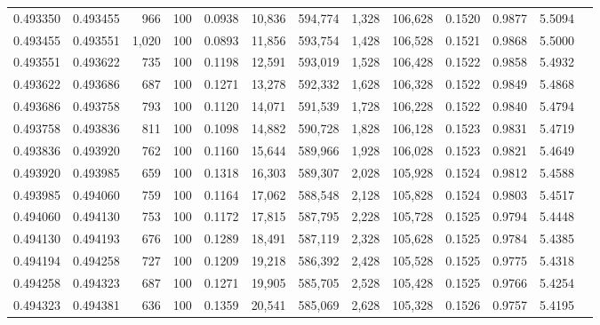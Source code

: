 \begin{tabular}{rrrrrrrrrrrrr}
0.493350 & 0.493455 &   966 & 100 &                                     0.0938 &  10,836 & 594,774 &   1,328 & 106,628 & 0.1520 & 0.9877 & 5.5094 \\
0.493455 & 0.493551 & 1,020 & 100 &                                     0.0893 &  11,856 & 593,754 &   1,428 & 106,528 & 0.1521 & 0.9868 & 5.5000 \\
0.493551 & 0.493622 &   735 & 100 &                                     0.1198 &  12,591 & 593,019 &   1,528 & 106,428 & 0.1522 & 0.9858 & 5.4932 \\
0.493622 & 0.493686 &   687 & 100 &                                     0.1271 &  13,278 & 592,332 &   1,628 & 106,328 & 0.1522 & 0.9849 & 5.4868 \\
0.493686 & 0.493758 &   793 & 100 &                                     0.1120 &  14,071 & 591,539 &   1,728 & 106,228 & 0.1522 & 0.9840 & 5.4794 \\
0.493758 & 0.493836 &   811 & 100 &                                     0.1098 &  14,882 & 590,728 &   1,828 & 106,128 & 0.1523 & 0.9831 & 5.4719 \\
0.493836 & 0.493920 &   762 & 100 &                                     0.1160 &  15,644 & 589,966 &   1,928 & 106,028 & 0.1523 & 0.9821 & 5.4649 \\
0.493920 & 0.493985 &   659 & 100 &                                     0.1318 &  16,303 & 589,307 &   2,028 & 105,928 & 0.1524 & 0.9812 & 5.4588 \\
0.493985 & 0.494060 &   759 & 100 &                                     0.1164 &  17,062 & 588,548 &   2,128 & 105,828 & 0.1524 & 0.9803 & 5.4517 \\
0.494060 & 0.494130 &   753 & 100 &                                     0.1172 &  17,815 & 587,795 &   2,228 & 105,728 & 0.1525 & 0.9794 & 5.4448 \\
0.494130 & 0.494193 &   676 & 100 &                                     0.1289 &  18,491 & 587,119 &   2,328 & 105,628 & 0.1525 & 0.9784 & 5.4385 \\
0.494194 & 0.494258 &   727 & 100 &                                     0.1209 &  19,218 & 586,392 &   2,428 & 105,528 & 0.1525 & 0.9775 & 5.4318 \\
0.494258 & 0.494323 &   687 & 100 &                                     0.1271 &  19,905 & 585,705 &   2,528 & 105,428 & 0.1525 & 0.9766 & 5.4254 \\
0.494323 & 0.494381 &   636 & 100 &                                     0.1359 &  20,541 & 585,069 &   2,628 & 105,328 & 0.1526 & 0.9757 & 5.4195 \\

\end{tabular}
